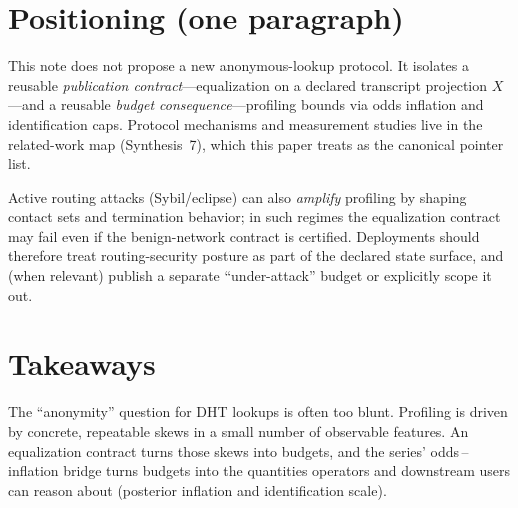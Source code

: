 \documentclass[11pt]{article}
\begin{document}
\section{Positioning (one paragraph)}
This note does not propose a new anonymous-lookup protocol.
It isolates a reusable \emph{publication contract}---equalization on a declared transcript projection $X$---and a reusable \emph{budget consequence}---profiling bounds via odds inflation and identification caps.
Protocol mechanisms and measurement studies live in the related-work map (Synthesis~7), which this paper treats as the canonical pointer list.\cite{series:relatedworkmap}


Active routing attacks (Sybil/eclipse) can also \emph{amplify} profiling by shaping contact sets and termination behavior; in such regimes the equalization contract may fail even if the benign-network contract is certified. Deployments should therefore treat routing-security posture as part of the declared state surface, and (when relevant) publish a separate ``under-attack'' budget or explicitly scope it out.\cite{nettoSybilIPFSDHT2025,cholezSybilIPFSARES2024}

\section{Takeaways}
The ``anonymity'' question for DHT lookups is often too blunt.
Profiling is driven by concrete, repeatable skews in a small number of observable features.
An equalization contract turns those skews into budgets, and the series' odds\,--\,inflation bridge turns budgets into the quantities operators and downstream users can reason about (posterior inflation and identification scale).
\end{document}
